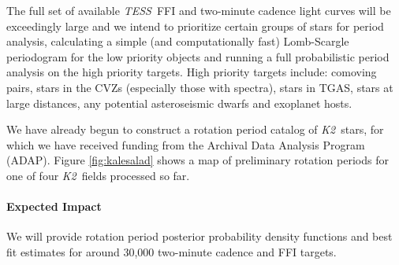 \documentclass[letterpaper,12pt,preprint]{hack_aastex}
\newcommand{\Ktwo}{{\it K2}}
\newcommand{\ktwo}{\Ktwo}
\newcommand{\TESS}{{\it TESS}}
\newcommand{\Gaia}{{\it Gaia}}
\begin{document}
The full set of available \TESS\ FFI and two-minute cadence light curves will
be exceedingly large and we intend to prioritize certain groups of stars for
period analysis, calculating a simple (and computationally fast) Lomb-Scargle
periodogram for the low priority objects and running a full probabilistic
period analysis on the high priority targets.
High priority targets include: comoving pairs, stars in the CVZs (especially
those with spectra), stars in TGAS, stars at large distances, any potential
asteroseismic dwarfs and exoplanet hosts.

We have already begun to construct a rotation period catalog of \ktwo\ stars,
for which we have received funding from the Archival Data Analysis Program
(ADAP).
Figure \ref{fig:kalesalad} shows a map of preliminary rotation periods for one
of four \ktwo\ fields processed so far.


\paragraph{Expected Impact}
We will provide rotation period posterior probability density functions and
best fit estimates for around 30,000 two-minute cadence and FFI targets.
\end{document}
